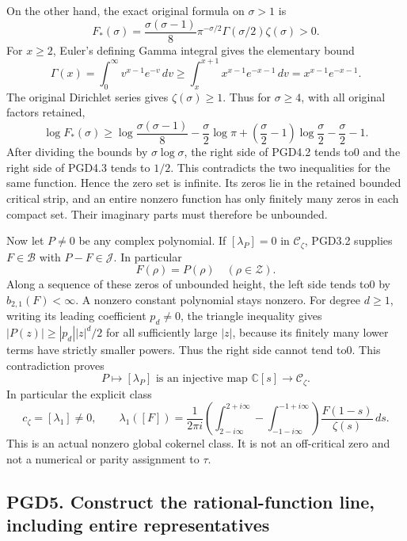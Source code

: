 On the other hand, the exact original formula on \(\sigma>1\) is \[
F_*(\sigma)=\frac{\sigma(\sigma-1)}8\pi^{-\sigma/2}
\Gamma(\sigma/2)\zeta(\sigma)>0.
\] For \(x\ge2\), Euler's defining Gamma integral gives the elementary
bound \[
\Gamma(x)=\int_0^\infty v^{x-1}e^{-v}\,dv
\ge\int_x^{x+1}x^{x-1}e^{-x-1}\,dv
=x^{x-1}e^{-x-1}.
\] The original Dirichlet series gives \(\zeta(\sigma)\ge1\). Thus for
\(\sigma\ge4\), with all original factors retained, \[
\log F_*(\sigma)\ge
\log\frac{\sigma(\sigma-1)}8-\frac\sigma2\log\pi
+\left(\frac\sigma2-1\right)\log\frac\sigma2-\frac\sigma2-1.
\tag{PGD4.3}
\] After dividing the bounds by \(\sigma\log\sigma\), the right side of
PGD4.2 tends to0 and the right side of PGD4.3 tends to \(1/2\). This
contradicts the two inequalities for the same function. Hence the zero
set is infinite. Its zeros lie in the retained bounded critical strip,
and an entire nonzero function has only finitely many zeros in each
compact set. Their imaginary parts must therefore be unbounded.

Now let \(P\ne0\) be any complex polynomial. If \([\lambda_P]=0\) in
\(\mathcal C_\zeta\), PGD3.2 supplies \(F\in\mathcal B\) with
\(P-F\in\mathcal J\). In particular \[
F(\rho)=P(\rho)\quad(\rho\in\mathscr Z).
\tag{PGD4.4}
\] Along a sequence of these zeros of unbounded height, the left side
tends to0 by \(b_{2,1}(F)<\infty\). A nonzero constant polynomial stays
nonzero. For degree \(d\ge1\), writing its leading coefficient
\(p_d\ne0\), the triangle inequality gives \(|P(z)|\ge |p_d||z|^d/2\)
for all sufficiently large \(|z|\), because its finitely many lower
terms have strictly smaller powers. Thus the right side cannot tend to0.
This contradiction proves \[
\boxed{P\longmapsto[\lambda_P]\text{ is an injective map }
\mathbb C[s]\longrightarrow\mathcal C_\zeta.}
\tag{PGD4.5}
\] In particular the explicit class \[
\boxed{c_\zeta=[\lambda_1]\ne0,\qquad
\lambda_1([F])=\frac1{2\pi i}
\left(\int_{2-i\infty}^{2+i\infty}-\int_{-1-i\infty}^{-1+i\infty}\right)
\frac{F(1-s)}{\zeta(s)}\,ds.}
\tag{PGD4.6}
\] This is an actual nonzero global cokernel class. It is not an
off-critical zero and not a numerical or parity assignment to \(\tau\).

\subsection{PGD5. Construct the rational-function line, including entire
representatives}\label{pgd5.-construct-the-rational-function-line-including-entire-representatives}

